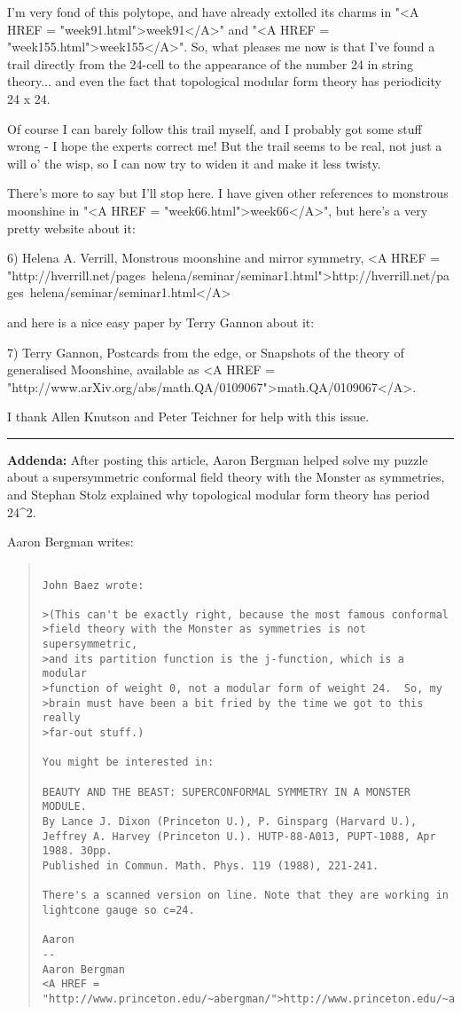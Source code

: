 I'm very fond of this polytope, and have already extolled its 
charms in "<A HREF = "week91.html">week91</A>" and
 "<A HREF = "week155.html">week155</A>".   So, what 
pleases me now
is that I've found a trail directly from the 24-cell to the
appearance of the number 24 in string theory... and even the
fact that topological modular form theory has periodicity 24 x 24.

Of course I can barely follow this trail myself, and I probably
got some stuff wrong - I hope the experts correct
me!  But the trail seems to be real, not just a will o' the wisp, 
so I can now try to widen it and make it less twisty.

There's more to say but I'll stop here.  I have given other 
references to monstrous moonshine in "<A HREF = "week66.html">week66</A>", but here's a 
very pretty website about it:

6) Helena A. Verrill, Monstrous moonshine and mirror symmetry, 
<A HREF = "http://hverrill.net/pages~helena/seminar/seminar1.html">http://hverrill.net/pages~helena/seminar/seminar1.html</A>

and here is a nice easy paper by Terry Gannon about it:

7) Terry Gannon, Postcards from the edge, or Snapshots of the 
theory of generalised Moonshine, available as <A HREF = 
"http://www.arXiv.org/abs/math.QA/0109067">math.QA/0109067</A>.

I thank Allen Knutson and Peter Teichner for help with
this issue.      
\par\noindent\rule{\textwidth}{0.4pt}
\textbf{Addenda:} After posting this article, Aaron Bergman helped 
solve my puzzle about a supersymmetric conformal field theory with 
the Monster as symmetries, and Stephan Stolz explained why
topological modular form theory has period 24^{2}. 

Aaron Bergman writes:
\begin{quote}

\begin{verbatim}

John Baez wrote:

>(This can't be exactly right, because the most famous conformal
>field theory with the Monster as symmetries is not supersymmetric,
>and its partition function is the j-function, which is a modular
>function of weight 0, not a modular form of weight 24.  So, my
>brain must have been a bit fried by the time we got to this really
>far-out stuff.)

You might be interested in:

BEAUTY AND THE BEAST: SUPERCONFORMAL SYMMETRY IN A MONSTER MODULE. 
By Lance J. Dixon (Princeton U.), P. Ginsparg (Harvard U.),
Jeffrey A. Harvey (Princeton U.). HUTP-88-A013, PUPT-1088, Apr
1988. 30pp. 
Published in Commun. Math. Phys. 119 (1988), 221-241.

There's a scanned version on line. Note that they are working in
lightcone gauge so c=24.

Aaron
-- 
Aaron Bergman
<A HREF = "http://www.princeton.edu/~abergman/">http://www.princeton.edu/~abergman/</A>
\end{verbatim}
    
\end{quote}


